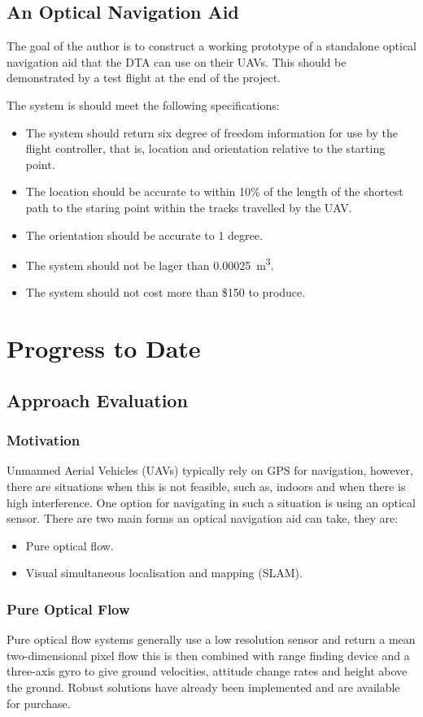 \documentclass[a4paper,12pt]{article}
\begin{document}
\subsection{An Optical Navigation Aid}
The goal of the author is to construct a working prototype of a standalone optical navigation aid that the DTA can use on their UAVs. This should be demonstrated by a test flight at the end of the project.

The system is should meet the following specifications:
\begin{itemize}
	\item The system should return six degree of freedom information for use by the flight controller, that is, location and orientation relative to the starting point.
	\item The location should be accurate to within 10\% of the length of the shortest path to the staring point within the tracks travelled by the UAV.
	\item The orientation should be accurate to 1 degree.
	\item The system should not be lager than \SI{0.00025}{m^{3}}.
	\item The system should not cost more than \$150 to produce.
\end{itemize}

\section{Progress to Date\label{sec:progress}}
\subsection{Approach Evaluation}
\subsubsection{Motivation\label{motivation}}
Unmanned Aerial Vehicles (UAVs) typically rely on GPS for navigation, however, there are situations when this is not feasible, such as, indoors and when there is high interference. One option for navigating in such a situation is using an optical sensor. There are two main forms an optical navigation aid can take, they are:
\begin{itemize}
	\item Pure optical flow. 
	\item Visual simultaneous localisation and mapping (SLAM).
\end{itemize}

\subsubsection{Pure Optical Flow}
Pure optical flow systems generally use a low resolution sensor and return a mean two-dimensional pixel flow this is then combined with range finding device and a three-axis gyro to give ground velocities, attitude change rates and height above the ground. Robust solutions have already been implemented and are available for purchase\cite{honegger2013open}.
\end{document}
